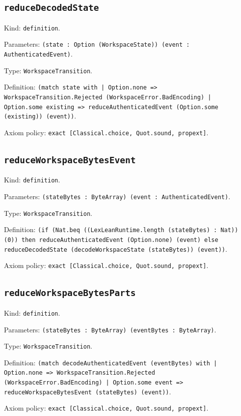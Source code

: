 \documentclass[11pt]{article}
\begin{document}
\subsection*{\texttt{reduceDecodedState}}
\noindent Kind: \texttt{definition}.\par
\noindent Parameters: \texttt{(state : Option (WorkspaceState)) (event : AuthenticatedEvent)}.\par
\noindent Type: \texttt{WorkspaceTransition}.\par
\noindent Definition: \texttt{(match state with | Option.none => WorkspaceTransition.Rejected (WorkspaceError.BadEncoding) | Option.some existing => reduceAuthenticatedEvent (Option.some (existing)) (event))}.\par
\noindent Axiom policy: \texttt{exact [Classical.choice, Quot.sound, propext]}.\par
\subsection*{\texttt{reduceWorkspaceBytesEvent}}
\noindent Kind: \texttt{definition}.\par
\noindent Parameters: \texttt{(stateBytes : ByteArray) (event : AuthenticatedEvent)}.\par
\noindent Type: \texttt{WorkspaceTransition}.\par
\noindent Definition: \texttt{(if (Nat.beq ((LexLeanRuntime.length (stateBytes) : Nat)) (0)) then reduceAuthenticatedEvent (Option.none) (event) else reduceDecodedState (decodeWorkspaceState (stateBytes)) (event))}.\par
\noindent Axiom policy: \texttt{exact [Classical.choice, Quot.sound, propext]}.\par
\subsection*{\texttt{reduceWorkspaceBytesParts}}
\noindent Kind: \texttt{definition}.\par
\noindent Parameters: \texttt{(stateBytes : ByteArray) (eventBytes : ByteArray)}.\par
\noindent Type: \texttt{WorkspaceTransition}.\par
\noindent Definition: \texttt{(match decodeAuthenticatedEvent (eventBytes) with | Option.none => WorkspaceTransition.Rejected (WorkspaceError.BadEncoding) | Option.some event => reduceWorkspaceBytesEvent (stateBytes) (event))}.\par
\noindent Axiom policy: \texttt{exact [Classical.choice, Quot.sound, propext]}.\par
\end{document}
